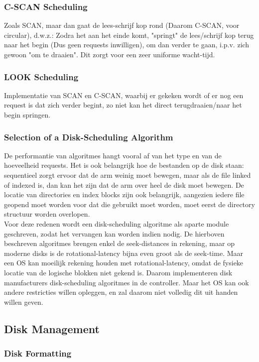 \subsubsection{C-SCAN Scheduling}
Zoals SCAN, maar dan gaat de lees-schrijf kop rond (Daarom C-SCAN, voor circular), d.w.z.: Zodra het aan het einde komt, "springt" de lees/schrijf kop terug naar het begin (Dus geen requests inwilligen), om dan verder te gaan, i.p.v. zich gewoon "om te draaien". Dit zorgt voor een zeer uniforme wacht-tijd.
\subsubsection{LOOK Scheduling}
Implementatie van SCAN en C-SCAN, waarbij er gekeken wordt of er nog een request is dat zich verder begint, zo niet kan het direct terugdraaien/naar het begin springen.
\subsubsection{Selection of a Disk-Scheduling Algorithm}
De performantie van algoritmes hangt vooral af van het type en van de hoeveelheid requests. Het is ook belangrijk hoe de bestanden op de disk staan: sequentieel zorgt ervoor dat de arm weinig moet bewegen, maar als de file linked of indexed is, dan kan het zijn dat de arm over heel de disk moet bewegen. De locatie van directories en index blocks zijn ook belangrijk, aangezien iedere file geopend moet worden voor dat die gebruikt moet worden, moet eerst de directory structuur worden overlopen. \\ Voor deze redenen wordt een disk-scheduling algoritme als aparte module geschreven, zodat het vervangen kan worden indien nodig. \whiteline De hierboven beschreven algoritmes brengen enkel de seek-distances in rekening, maar op moderne disks is de rotational-latency bijna even groot als de seek-time. Maar een OS kan moeilijk rekening houden met rotational-latency, omdat de fysieke locatie van de logische blokken niet gekend is. Daarom implementeren disk manufacturers disk-scheduling algoritmes in de controller. Maar het OS kan ook andere restricties willen opleggen, en zal daarom niet volledig dit uit handen willen geven.
\subsection{Disk Management}
\subsubsection{Disk Formatting}
